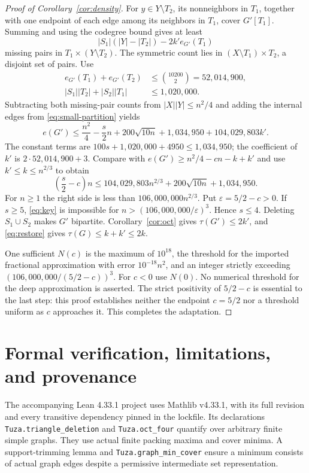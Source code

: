 \documentclass[11pt]{article}
\begin{document}
\begin{proof}[Proof of Corollary~\ref{cor:density}]
For $y\in Y\setminus T_2$, its nonneighbors in $T_1$, together with
one endpoint of each edge among its neighbors in $T_1$, cover $G'[T_1]$.
Summing and using the codegree bound gives at least
\begin{equation}\label{eq:missing}
|S_1|(|Y|-|T_2|)-2k'e_{G'}(T_1)
\end{equation}
missing pairs in $T_1\times(Y\setminus T_2)$. The symmetric count
lies in $(X\setminus T_1)\times T_2$, a disjoint set of pairs.
Use
\begin{equation}\label{eq:witness-numbers}
\begin{aligned}
e_{G'}(T_1)+e_{G'}(T_2)&\le\binom{10200}{2}=52,014,900,\\
|S_1||T_2|+|S_2||T_1|&\le1,020,000.
\end{aligned}
\end{equation}
Subtracting both missing-pair counts from $|X||Y|\le n^2/4$ and
adding the internal edges from \eqref{eq:small-partition} yields
\begin{equation}\label{eq:upper}
e(G')\le\frac{n^2}{4}-\frac{s}{2}n
 +200\sqrt{10n}+1,034,950+104,029,803k'.
\end{equation}
The constant terms are $100s+1,020,000+4950\le1,034,950$;
the coefficient of $k'$ is $2\cdot52,014,900+3$.
Compare with $e(G')\ge n^2/4-cn-k+k'$ and use
$k'\le k\le n^{2/3}$ to obtain
\begin{equation}\label{eq:key}
\left(\frac{s}{2}-c\right)n
\le104,029,803n^{2/3}+200\sqrt{10n}+1,034,950.
\end{equation}
For $n\ge1$ the right side is less than $106,000,000n^{2/3}$.
Put $\varepsilon=5/2-c>0$. If $s\ge5$, \eqref{eq:key} is impossible
for $n>(106,000,000/\varepsilon)^3$. Hence $s\le4$.
Deleting $S_1\cup S_2$ makes $G'$ bipartite. Corollary~\ref{cor:oct}
gives $\tau(G')\le2k'$, and \eqref{eq:restore} gives
$\tau(G)\le k+k'\le2k$.

One sufficient $N(c)$ is the maximum of $10^{18}$, the threshold for
the imported fractional approximation with error $10^{-18}n^2$, and
an integer strictly exceeding $(106,000,000/(5/2-c))^3$.
For $c<0$ use $N(0)$. No numerical threshold for the deep approximation
is asserted. The strict positivity of $5/2-c$ is essential to the
last step: this proof establishes neither the endpoint $c=5/2$ nor a
threshold uniform as $c$ approaches it. This completes the adaptation.
\end{proof}

\section{Formal verification, limitations, and provenance}
The accompanying Lean 4.33.1 project uses Mathlib v4.33.1, with its full
revision and every transitive dependency pinned in the lockfile.
Its declarations \texttt{Tuza.triangle\_deletion} and
\texttt{Tuza.oct\_four} quantify over arbitrary finite simple graphs.
They use actual finite packing maxima and cover minima. A support-trimming
lemma and \texttt{Tuza.graph\_min\_cover} ensure a minimum consists of
actual graph edges despite a permissive intermediate set representation.
\end{document}
